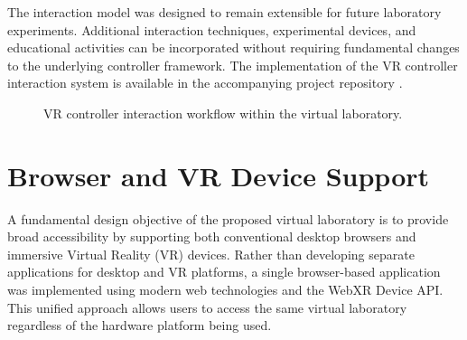 The interaction model was designed to remain extensible for future laboratory experiments. Additional interaction techniques, experimental devices, and educational activities can be incorporated without requiring fundamental changes to the underlying controller framework. The implementation of the VR controller interaction system is available in the accompanying project repository \cite{thesisRepo}.

\begin{figure}[H]
\centering
{}

\caption{VR controller interaction workflow within the virtual laboratory.}
\label{fig:vr_controller_interaction}
\end{figure}

\section{Browser and VR Device Support}

A fundamental design objective of the proposed virtual laboratory is to provide broad accessibility by supporting both conventional desktop browsers and immersive Virtual Reality (VR) devices. Rather than developing separate applications for desktop and VR platforms, a single browser-based application was implemented using modern web technologies and the WebXR Device API. This unified approach allows users to access the same virtual laboratory regardless of the hardware platform being used.

